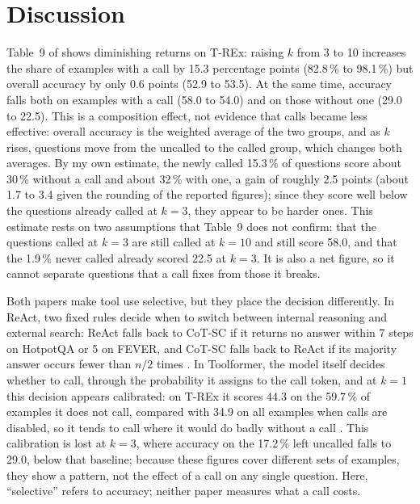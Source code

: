\documentclass[11pt]{article}
\begin{document}
\section{Discussion}
\label{sec:discussion}
Table~9 of \citet{schick2023toolformer} shows diminishing returns on T-REx:
raising $k$ from 3 to 10 increases the share of examples with a call by
15.3 percentage points (82.8\,\% to 98.1\,\%) but overall accuracy by only
0.6 points (52.9 to 53.5). At the same time, accuracy falls both on examples
with a call (58.0 to 54.0) and on those without one (29.0 to 22.5). This is a
composition effect, not evidence that calls became less effective: overall
accuracy is the weighted average of the two groups, and as $k$ rises,
questions move from the uncalled to the called group, which changes both
averages. By my own estimate, the newly called 15.3\,\% of questions score
about 30\,\% without a call and about 32\,\% with one, a gain of roughly
2.5 points (about 1.7 to 3.4 given the rounding of the reported figures);
since they score well below the questions already called at $k=3$, they
appear to be harder ones. This estimate rests on two assumptions that
Table~9 does not confirm: that the questions called at $k=3$ are still
called at $k=10$ and still score 58.0, and that the 1.9\,\% never called
already scored 22.5 at $k=3$. It is also a net figure, so it cannot
separate questions that a call fixes from those it breaks.

Both papers make tool use selective, but they place the decision
differently. In ReAct, two fixed rules decide when to switch between
internal reasoning and external search: ReAct falls back to CoT-SC if it
returns no answer within 7 steps on HotpotQA or 5 on FEVER, and CoT-SC
falls back to ReAct if its majority answer occurs fewer than $n/2$ times
\citep{yao2023react}. In Toolformer, the model itself decides whether to
call, through the probability it assigns to the call token, and at $k=1$
this decision appears calibrated: on T-REx it scores 44.3 on the
59.7\,\% of examples it does not call, compared with 34.9 on all examples
when calls are disabled, so it tends to call where it would do badly
without a call \citep{schick2023toolformer}. This calibration is lost at
$k=3$, where accuracy on the 17.2\,\% left uncalled falls to 29.0, below
that baseline; because these figures cover different sets of examples,
they show a pattern, not the effect of a call on any single question.
Here, ``selective'' refers to accuracy; neither paper measures what a
call costs.
\end{document}
